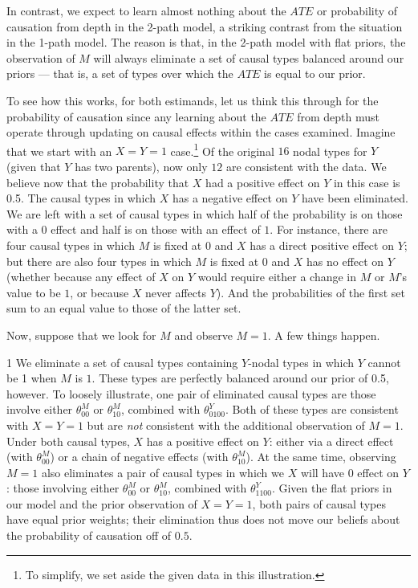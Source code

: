 \documentclass[
  12pt,
]{book}
\begin{document}
In contrast, we expect to learn almost nothing about the \(ATE\) or probability of causation from depth in the 2-path model, a striking contrast from the situation in the 1-path model. The reason is that, in the 2-path model with flat priors, the observation of \(M\) will always eliminate a set of causal types balanced around our priors --- that is, a set of types over which the \(ATE\) is equal to our prior.

To see how this works, for both estimands, let us think this through for the probability of causation since any learning about the \(ATE\) from depth must operate through updating on causal effects within the cases examined. Imagine that we start with an \(X=Y=1\) case.\footnote{To simplify, we set aside the given data in this illustration.} Of the original \(16\) nodal types for \(Y\) (given that \(Y\) has two parents), now only \(12\) are consistent with the data. We believe now that the probability that \(X\) had a positive effect on \(Y\) in this case is 0.5. The causal types in which \(X\) has a negative effect on \(Y\) have been eliminated. We are left with a set of causal types in which half of the probability is on those with a \(0\) effect and half is on those with an effect of \(1\). For instance, there are four causal types in which \(M\) is fixed at \(0\) and \(X\) has a direct positive effect on \(Y\); but there are also four types in which \(M\) is fixed at \(0\) and \(X\) has no effect on \(Y\) (whether because any effect of \(X\) on \(Y\) would require either a change in \(M\) or \(M\)'s value to be \(1\), or because \(X\) never affects \(Y\)). And the probabilities of the first set sum to an equal value to those of the latter set.

Now, suppose that we look for \(M\) and observe \(M=1\). A few things happen.

1 We eliminate a set of causal types containing \(Y\)-nodal types in which \(Y\) cannot be 1 when \(M\) is \(1\). These types are perfectly balanced around our prior of 0.5, however. To loosely illustrate, one pair of eliminated causal types are those involve either \(\theta^M_{00}\) or \(\theta^M_{10}\), combined with \(\theta^Y_{0100}\). Both of these types are consistent with \(X=Y=1\) but are \emph{not} consistent with the additional observation of \(M=1\). Under both causal types, \(X\) has a positive effect on \(Y\): either via a direct effect (with \(\theta^M_{00}\)) or a chain of negative effects (with \(\theta^M_{10}\)). At the same time, observing \(M=1\) also eliminates a pair of causal types in which we \(X\) will have \(0\) effect on \(Y\): those involving either \(\theta^M_{00}\) or \(\theta^M_{10}\), combined with \(\theta^Y_{1100}\). Given the flat priors in our model and the prior observation of \(X=Y=1\), both pairs of causal types have equal prior weights; their elimination thus does not move our beliefs about the probability of causation off of \(0.5\).
\end{document}
